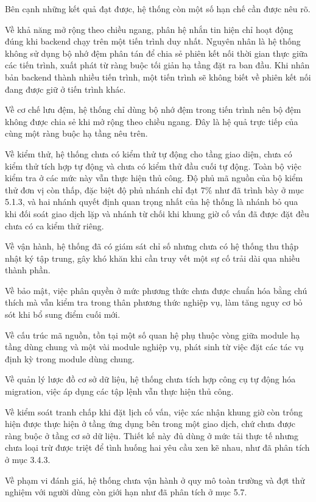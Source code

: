 \documentclass[12pt,a4paper,oneside]{report}
\begin{document}
Bên cạnh những kết quả đạt được, hệ thống còn một số hạn chế cần được nêu rõ.

Về khả năng mở rộng theo chiều ngang, phân hệ nhắn tin hiện chỉ hoạt động đúng khi backend chạy trên một tiến trình duy nhất. Nguyên nhân là hệ thống không sử dụng bộ nhớ đệm phân tán để chia sẻ phiên kết nối thời gian thực giữa các tiến trình, xuất phát từ ràng buộc tối giản hạ tầng đặt ra ban đầu. Khi nhân bản backend thành nhiều tiến trình, một tiến trình sẽ không biết về phiên kết nối đang được giữ ở tiến trình khác.

Về cơ chế lưu đệm, hệ thống chỉ dùng bộ nhớ đệm trong tiến trình nên bộ đệm không được chia sẻ khi mở rộng theo chiều ngang. Đây là hệ quả trực tiếp của cùng một ràng buộc hạ tầng nêu trên.

Về kiểm thử, hệ thống chưa có kiểm thử tự động cho tầng giao diện, chưa có kiểm thử tích hợp tự động và chưa có kiểm thử đầu cuối tự động. Toàn bộ việc kiểm tra ở các mức này vẫn thực hiện thủ công. Độ phủ mã nguồn của bộ kiểm thử đơn vị còn thấp, đặc biệt độ phủ nhánh chỉ đạt 7\% như đã trình bày ở mục 5.1.3, và hai nhánh quyết định quan trọng nhất của hệ thống là nhánh bỏ qua khi đối soát giao dịch lặp và nhánh từ chối khi khung giờ cố vấn đã được đặt đều chưa có ca kiểm thử riêng.

Về vận hành, hệ thống đã có giám sát chỉ số nhưng chưa có hệ thống thu thập nhật ký tập trung, gây khó khăn khi cần truy vết một sự cố trải dài qua nhiều thành phần.

Về bảo mật, việc phân quyền ở mức phương thức chưa được chuẩn hóa bằng chú thích mà vẫn kiểm tra trong thân phương thức nghiệp vụ, làm tăng nguy cơ bỏ sót khi bổ sung điểm cuối mới.

Về cấu trúc mã nguồn, tồn tại một số quan hệ phụ thuộc vòng giữa module hạ tầng dùng chung và một vài module nghiệp vụ, phát sinh từ việc đặt các tác vụ định kỳ trong module dùng chung.

Về quản lý lược đồ cơ sở dữ liệu, hệ thống chưa tích hợp công cụ tự động hóa migration, việc áp dụng các tập lệnh vẫn thực hiện thủ công.

Về kiểm soát tranh chấp khi đặt lịch cố vấn, việc xác nhận khung giờ còn trống hiện được thực hiện ở tầng ứng dụng bên trong một giao dịch, chứ chưa được ràng buộc ở tầng cơ sở dữ liệu. Thiết kế này đủ dùng ở mức tải thực tế nhưng chưa loại trừ được triệt để tình huống hai yêu cầu xen kẽ nhau, như đã phân tích ở mục 3.4.3.

Về phạm vi đánh giá, hệ thống chưa vận hành ở quy mô toàn trường và đợt thử nghiệm với người dùng còn giới hạn như đã phân tích ở mục 5.7.
\end{document}
